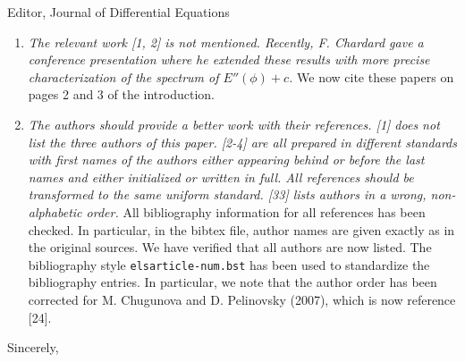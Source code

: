 \documentclass[11pt]{letter}
\begin{document}
\begin{letter}{Editor, Journal of Differential Equations}
\begin{enumerate}
    \item \emph{The relevant work [1, 2] is not mentioned. Recently, F. Chardard gave a conference presentation where he extended these results with more precise characterization of the spectrum of $E''(\phi) + c$.} We now cite these papers on pages 2 and 3 of the introduction.
    \vspace{4mm}

    \item \emph{The authors should provide a better work with their references. [1] does not list the three authors of this paper. [2-4] are all prepared in different standards with first names of the authors either appearing behind or before the last names and either initialized or written in full. All references should be transformed to the same uniform standard. [33] lists authors in a wrong, non-alphabetic order.} All bibliography information for all references has been checked. In particular, in the bibtex file, author names are given exactly as in the original sources. We have verified that all authors are now listed. The bibliography style \texttt{elsarticle-num.bst} has been used to standardize the bibliography entries. In particular, we note that the author order has been corrected for M. Chugunova and D. Pelinovsky (2007), which is now reference [24].
\end{enumerate}



\closing{Sincerely,}

\end{letter}
\end{document}
